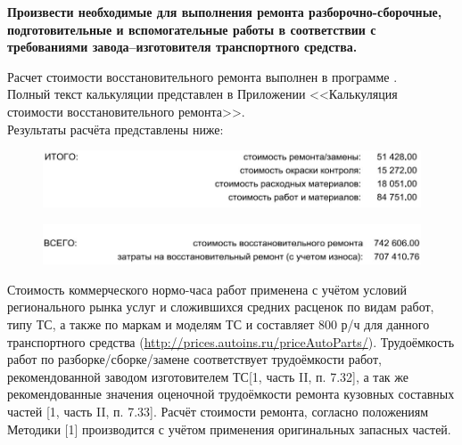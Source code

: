 \renewcommand\baselinestretch{1.2}\small\normalsize
%
\textbf{Произвести  необходимые для выполнения  ремонта разборочно-сборочные, подготовительные и вспомогательные работы в соответствии с требованиями завода–изгото\-ви\-теля транспортного средства.}\\
\par Расчет стоимости восстановительного ремонта выполнен в программе \auda.\\
Полный текст калькуляции представлен в Приложении  <<Калькуляция стоимости восстановительного ремонта>>.\\ 
\indent Результаты расчёта представлены ниже:
\vspace{3mm}
%
\begin{figure}[H]
	\centering
	\includegraphics[width=0.95\linewidth]{images/Screenshot_1}
\end{figure}
\begin{figure}[H]
	\centering
	\includegraphics[width=0.95\linewidth]{images/Screenshot_2}
\end{figure}
\medskip
\renewcommand\baselinestretch{1.2}\small\normalsize
Стоимость коммерческого нормо-часа работ применена  с учётом условий регионального рынка услуг и сложившихся средних расценок по видам работ, типу ТС, а также по маркам и моделям ТС  и   составляет 800 р/ч для данного транспортного средства (\url{http://prices.autoins.ru/priceAutoParts/}). Трудоёмкость работ по разборке/сборке/замене  соответствует трудоёмкости работ, рекомендованной заводом изготовителем ТС[1, часть II, п. 7.32], а так же рекомендованные значения оценочной трудоёмкости ремонта кузовных составных частей [1, часть II, п. 7.33]. Расчёт стоимости ремонта, согласно положениям Методики [1] производится с учётом  применения оригинальных запасных частей. %
